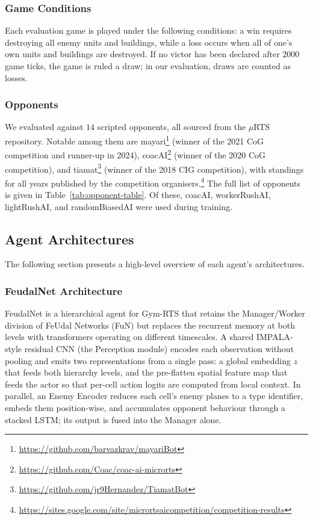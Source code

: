 \documentclass[sigconf,review=false]{acmart}
\begin{document}
\subsubsection{Game Conditions}
Each evaluation game is played under the following conditions: a win requires destroying all enemy units and buildings, while a loss occurs when all of one's own units and buildings are destroyed. 
If no victor has been declared after $2000$ game ticks, the game is ruled a draw; in our evaluation, draws are counted as losses.

\subsubsection{Opponents}
We evaluated against $14$ scripted opponents, all sourced from the
$\mu$RTS repository. Notable among them are
mayari\footnote{\url{https://github.com/barvazkrav/mayariBot}}
(winner of the 2021 CoG competition and runner-up in 2024),
coacAI\footnote{\url{https://github.com/Coac/coac-ai-microrts}}
(winner of the 2020 CoG competition), and
tiamat\footnote{\url{https://github.com/jr9Hernandez/TiamatBot}}
(winner of the 2018 CIG competition), with standings for all years
published by the competition
organisers.\footnote{\url{https://sites.google.com/site/micrortsaicompetition/competition-results}}
The full list of opponents is given in Table~\ref{tab:opponent-table}.
Of these, coacAI, workerRushAI, lightRushAI, and randomBiasedAI were
used during training.

\subsection{Agent Architectures}

The following section presents a high-level overview of each agent's architectures.

\subsubsection{FeudalNet Architecture}

FeudalNet is a hierarchical agent for Gym-\textmu RTS that retains the Manager/Worker division of FeUdal Networks (FuN) \cite{FuN} but replaces the recurrent memory at both levels with transformers operating on different timescales.
A shared IMPALA-style \cite{impala-cnn} residual CNN (the Perception module) encodes each observation without pooling and emits two representations from a single pass: a global embedding $z$ that feeds both hierarchy levels, and the pre-flatten spatial feature map that feeds the actor so that per-cell action logits are computed from local context. 
In parallel, an Enemy Encoder reduces each cell's enemy planes to a type identifier, embeds them position-wise, and accumulates opponent behaviour through a stacked LSTM; its output is fused into the Manager alone.
\end{document}
